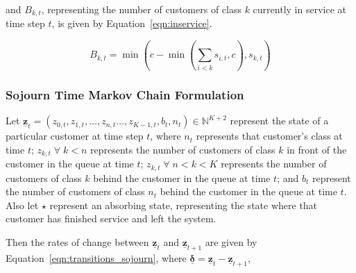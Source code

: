 \documentclass{article}
\begin{document}
and $B_{k,t}$, representing the number of customers of class $k$ currently in
service at time step $t$, is given by Equation~\ref{eqn:inservice}.

\begin{equation}\label{eqn:inservice}
B_{k,t} =\min\left(c - \min\left(\sum_{i < k} s_{i,t}, c\right), s_{k,t}\right)
\end{equation}

\subsubsection{Sojourn Time Markov Chain Formulation}\label{sec:sojourn_formulation}
Let $\underline{\mathbf{z}}_t = (z_{0,t}, z_{1,t}, \dots, z_{n,t} \dots, z_{K-1,t}, b_t, n_t) \in \mathbb{N}^{K+2}$
represent the state of a particular customer at time step $t$, where $n_t$
represents that customer's class at time $t$; $z_{k,t} \; \forall \; k < n$
represents the number of customers of class $k$ in front of the customer in the
queue at time $t$; $z_{k,t} \; \forall \; n < k < K$ represents the number of
customers of class $k$ behind the customer in the queue at time $t$; and $b_t$
represent the number of customers of class $n_t$ behind the customer in the
queue at time $t$.
Also let $\star$ represent an absorbing state, representing the state where that
customer has finished service and left the system.

Then the rates of change between $\underline{\mathbf{z}}_t$ and
$\underline{\mathbf{z}}_{t+1}$ are given by Equation~\ref{eqn:transitions_sojourn},
where $\underline{\mathbf{\delta}} = \underline{\mathbf{z}}_t - \underline{\mathbf{z}}_{t+1}$,
\end{document}
